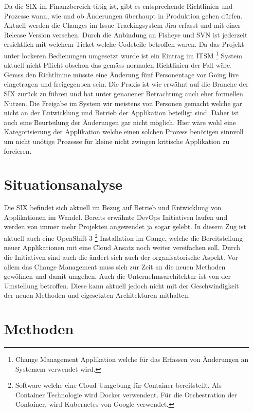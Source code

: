 Da die SIX im Finanzbereich tätig ist, gibt es entsprechende Richtlinien und Prozesse wann, wie und ob Änderungen überhaupt in Produktion gehen dürfen. Aktuell werden die Changes im Issue Trackingsystem Jira erfasst und mit einer Release Version versehen. Durch die Anbindung an Fisheye und SVN ist jederzeit ersichtlich mit welchem Ticket welche Codeteile betroffen waren. Da das Projekt unter lockeren Bedienungen umgesetzt wurde ist ein Eintrag im ITSM \footnote{Change Management Applikation welche für das Erfassen von Änderungen an Systemem verwendet wird.} System aktuell nicht Pflicht obschon das gemäss normalen Richtlinien der Fall wäre. 
Gemss den Richtlinine müsste eine Änderung fünf Personentage vor Going live eingetragen und freigegenben sein. Die Praxis ist wie erwähnt auf die Branche der SIX zurück zu führen und hat unter genauener Betrachtung auch eher formellen Nutzen. Die Freigabe im System wir meistens von Personen gemacht welche gar nicht an der Entwicklung und Betrieb der Applikation beteiligt sind. Daher ist auch eine Beurteilung der Änderungen gar nicht möglich. Hier wäre wohl eine Kategorisierung der Applikation welche einen solchen Prozess benötigen sinnvoll um nicht unötige Prozesse für kleine nicht zwingen kritische Applikation zu forcieren.

\section{Situationsanalyse}

Die SIX befindet sich aktuell im Bezug auf Betrieb und Entwicklung von Applikationen im Wandel. Bereits erwähnte DevOps Initiativen laufen und werden von immer mehr Projekten angewendet ja sogar gelebt. In diesem Zug ist aktuell auch eine OpenShift 3 \footnote{Software welche eine Cloud Umgebung für Container bereitstellt. Als Container Technologie wird Docker verwendent. Für die Orchestration der Container, wird Kubernetes von Google verwendet.} Installation im Gange, welche die Bereitstellung neuer Applikationen mit eine Cloud Ansatz noch weiter vereifachen soll.
Durch die Initiativen sind auch die ändert sich auch der organisatorische Aspekt. Vor allem das Change Management muss sich zur Zeit an die neuen Methoden gewöhnen und damit umgehen.
Auch die Unternehmsarchitektur ist von der Umstellung betroffen. Diese kann aktuell jedoch nicht mit der Geschwindigkeit der neuen Methoden und eigesetzten Architekturen mithalten. 

\section{Methoden}

